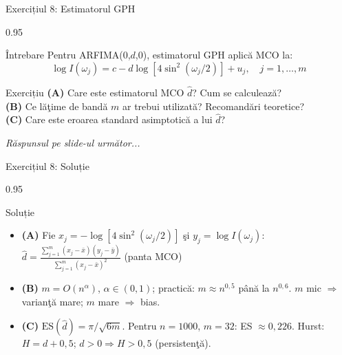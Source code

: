 \documentclass[9pt, aspectratio=169, t]{beamer}
\begin{document}
\begin{frame}{Exercițiul 8: Estimatorul GPH}
    \begin{cminipage}{0.95\textwidth}
    {\small
    \begin{alertblock}{Întrebare}
        Pentru ARFIMA(0,$d$,0), estimatorul GPH aplică MCO la:
        \[
            \log I(\omega_j) = c - d\log[4\sin^2(\omega_j/2)] + u_j, \quad j=1,\ldots,m
        \]
    \end{alertblock}

    \vspace{0.1cm}

    \begin{block}{Exercițiu}
        \textcolor{MainBlue}{\textbf{(A)}} Care este estimatorul MCO $\hat{d}$? Cum se calculează?\\[3pt]
        \textcolor{MainBlue}{\textbf{(B)}} Ce lăţime de bandă $m$ ar trebui utilizată? Recomandări teoretice?\\[3pt]
        \textcolor{MainBlue}{\textbf{(C)}} Care este eroarea standard asimptotică a lui $\hat{d}$?
    \end{block}

    \vspace{0.1cm}
    \begin{center}
        \textit{Răspunsul pe slide-ul următor...}
    \end{center}
    }
    \end{cminipage}
\end{frame}

\begin{frame}{Exercițiul 8: Soluție}
    \begin{cminipage}{0.95\textwidth}
    \begin{exampleblock}{Soluție}
        {\footnotesize
        \begin{itemize}\setlength{\itemsep}{0pt}
            \item \textcolor{MainBlue}{\textbf{(A)}} Fie $x_j = -\log[4\sin^2(\omega_j/2)]$ şi $y_j = \log I(\omega_j)$:
            $\hat{d} = \frac{\sum_{j=1}^m (x_j - \bar{x})(y_j - \bar{y})}{\sum_{j=1}^m (x_j - \bar{x})^2}$ \quad (panta MCO)
            \item \textcolor{MainBlue}{\textbf{(B)}} $m = O(n^\alpha)$, $\alpha \in (0,1)$; practică: $m \approx n^{0{,}5}$ până la $n^{0{,}6}$. $m$ mic $\Rightarrow$ varianţă mare; $m$ mare $\Rightarrow$ bias.
            \item \textcolor{MainBlue}{\textbf{(C)}} $\text{ES}(\hat{d}) = \pi/\sqrt{6m}$. Pentru $n=1000$, $m=32$: ES $\approx 0{,}226$. Hurst: $H = d+0{,}5$; $d>0 \Rightarrow H>0{,}5$ (persistenţă).
        \end{itemize}
        }
    \end{exampleblock}
    \end{cminipage}
\end{frame}
\end{document}
